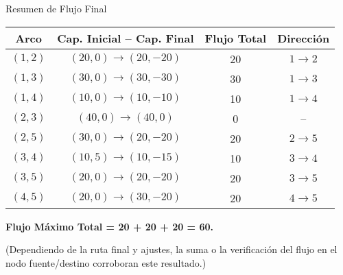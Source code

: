 \documentclass{beamer}
\begin{document}
\begin{frame}{Resumen de Flujo Final}
\small
\begin{tabular}{|c|c|c|c|}
\hline
\textbf{Arco} & \textbf{Cap. Inicial -- Cap. Final} & \textbf{Flujo Total} & \textbf{Dirección} \\
\hline
$(1,2)$ & $(20,0)\rightarrow(20,-20)$ & 20 & $1\rightarrow 2$ \\
$(1,3)$ & $(30,0)\rightarrow(30,-30)$ & 30 & $1\rightarrow 3$ \\
$(1,4)$ & $(10,0)\rightarrow(10,-10)$ & 10 & $1\rightarrow 4$ \\
$(2,3)$ & $(40,0)\rightarrow(40,0)$ & 0  & -- \\
$(2,5)$ & $(30,0)\rightarrow(20,-20)$ & 20 & $2\rightarrow 5$ \\
$(3,4)$ & $(10,5)\rightarrow(10,-15)$ & 10 & $3\rightarrow 4$ \\
$(3,5)$ & $(20,0)\rightarrow(20,-20)$ & 20 & $3\rightarrow 5$ \\
$(4,5)$ & $(20,0)\rightarrow(30,-20)$ & 20 & $4\rightarrow 5$ \\
\hline
\end{tabular}

\vspace{1em}
\textbf{Flujo Máximo Total = 20 + 20 + 20 = 60.}

(Dependiendo de la ruta final y ajustes, la suma o la verificación del flujo en el nodo fuente/destino corroboran este resultado.)
\end{frame}
\end{document}
